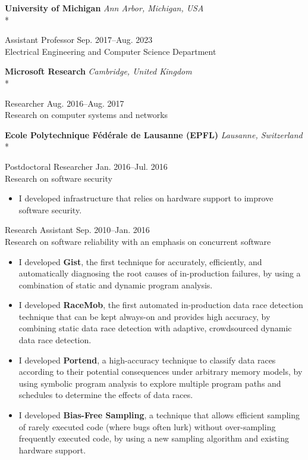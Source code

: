 \documentclass[10pt]{article}
\newcommand{\mysub}[3]{\textbf{#1} {#2} \hfill {\em #3}}
\newcommand{\myssub}[1]{%
  \par\begingroup
    \leftskip=2mm\relax
    \noindent #1\par
  \endgroup
  \vspace{1mm}%
}
\newenvironment{keepblock}{\par\Needspace{4\baselineskip}\noindent}{\par}
\begin{document}
\begin{keepblock}
\mysub{University of Michigan}{}{Ann Arbor, Michigan, USA} \\*
\myssub{Assistant Professor\vspace{1mm} \hfill Sep. 2017--Aug. 2023 \\
Electrical Engineering and Computer Science Department}
\end{keepblock}

\begin{keepblock}
\mysub{Microsoft Research}{}{Cambridge, United Kingdom} \\*
\myssub{\vspace{1mm}Researcher \hfill Aug. 2016--Aug. 2017 \\
Research on computer systems and networks}
\end{keepblock}

\begin{keepblock}
\mysub{Ecole Polytechnique F\'ed\'erale de Lausanne (EPFL)}{}{Lausanne, Switzerland} \\*
\myssub{\vspace{1mm}Postdoctoral Researcher \hfill Jan. 2016--Jul. 2016 \\
Research on software security
\begin{itemize}
\item{I developed infrastructure that relies on hardware support to improve software security.}
\end{itemize}
}
\end{keepblock}

\myssub{\vspace{1mm}Research Assistant \hfill Sep. 2010--Jan. 2016 \\
Research on software reliability with an emphasis on concurrent software
\vspace{-1mm}
\begin{itemize}
\setlength\itemsep{0em}
\item{I developed \textbf{Gist}, the first technique for accurately, efficiently, and automatically diagnosing the root causes of in-production failures, by using a combination of static and dynamic program analysis.}
\item{I developed \textbf{RaceMob}, the first automated in-production data race detection technique that can be kept always-on and provides high accuracy, by combining static data race detection with adaptive, crowdsourced dynamic data race detection.}
\item{I developed \textbf{Portend}, a high-accuracy technique to classify data races according to their potential consequences under arbitrary memory models, by using symbolic program analysis to explore multiple program paths and schedules to determine the effects of data races.}
\item{I developed \textbf{Bias-Free Sampling}, a technique that allows efficient sampling of rarely executed code (where bugs often lurk) without over-sampling frequently executed code, by using a new sampling algorithm and existing hardware support.}\\
\end{itemize}
\vspace{-5mm}
}
\end{document}
